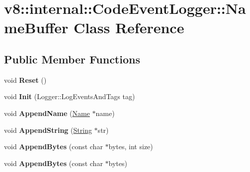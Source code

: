 \hypertarget{classv8_1_1internal_1_1_code_event_logger_1_1_name_buffer}{}\section{v8\+:\+:internal\+:\+:Code\+Event\+Logger\+:\+:Name\+Buffer Class Reference}
\label{classv8_1_1internal_1_1_code_event_logger_1_1_name_buffer}
\subsection*{Public Member Functions}
\begin{DoxyCompactItemize}
\item 
\hypertarget{classv8_1_1internal_1_1_code_event_logger_1_1_name_buffer_a2f4816566d8394a82560375ccea82bfa}{}void {\bfseries Reset} ()\label{classv8_1_1internal_1_1_code_event_logger_1_1_name_buffer_a2f4816566d8394a82560375ccea82bfa}

\item 
\hypertarget{classv8_1_1internal_1_1_code_event_logger_1_1_name_buffer_a05b2880413af02e892ca99f7d12f1e48}{}void {\bfseries Init} (Logger\+::\+Log\+Events\+And\+Tags tag)\label{classv8_1_1internal_1_1_code_event_logger_1_1_name_buffer_a05b2880413af02e892ca99f7d12f1e48}

\item 
\hypertarget{classv8_1_1internal_1_1_code_event_logger_1_1_name_buffer_a2d3c2d750b61f0da98193804e2a4eff6}{}void {\bfseries Append\+Name} (\hyperlink{classv8_1_1internal_1_1_name}{Name} $\ast$name)\label{classv8_1_1internal_1_1_code_event_logger_1_1_name_buffer_a2d3c2d750b61f0da98193804e2a4eff6}

\item 
\hypertarget{classv8_1_1internal_1_1_code_event_logger_1_1_name_buffer_acf07bc22dd108df5d7cffa753c021a5b}{}void {\bfseries Append\+String} (\hyperlink{classv8_1_1internal_1_1_string}{String} $\ast$str)\label{classv8_1_1internal_1_1_code_event_logger_1_1_name_buffer_acf07bc22dd108df5d7cffa753c021a5b}

\item 
\hypertarget{classv8_1_1internal_1_1_code_event_logger_1_1_name_buffer_afbbcc095e6a286550d3368e86bcdab2d}{}void {\bfseries Append\+Bytes} (const char $\ast$bytes, int size)\label{classv8_1_1internal_1_1_code_event_logger_1_1_name_buffer_afbbcc095e6a286550d3368e86bcdab2d}

\item 
\hypertarget{classv8_1_1internal_1_1_code_event_logger_1_1_name_buffer_a5db4ff91339345c223d9f376f93ee4dc}{}void {\bfseries Append\+Bytes} (const char $\ast$bytes)\label{classv8_1_1internal_1_1_code_event_logger_1_1_name_buffer_a5db4ff91339345c223d9f376f93ee4dc}


\end{DoxyCompactItemize}
